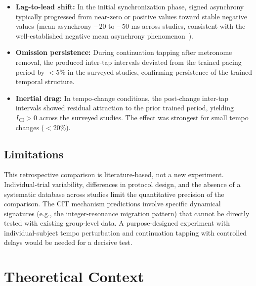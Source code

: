 \documentclass[12pt,a4paper]{article}
\begin{document}
\begin{itemize}

\item \textbf{Lag-to-lead shift:} In the initial synchronization phase, signed asynchrony typically progressed from near-zero or positive values toward stable negative values (mean asynchrony $-20$ to $-50$ ms across studies, consistent with the well-established negative mean asynchrony phenomenon~\cite{repp2005sensorimotor}).

\item \textbf{Omission persistence:} During continuation tapping after metronome removal, the produced inter-tap intervals deviated from the trained pacing period by $<5\%$ in the surveyed studies, confirming persistence of the trained temporal structure.

\item \textbf{Inertial drag:} In tempo-change conditions, the post-change inter-tap intervals showed residual attraction to the prior trained period, yielding $I_{\mathrm{CI}} > 0$ across the surveyed studies. The effect was strongest for small tempo changes ($<20\%$).

\end{itemize}



\subsection{Limitations}



This retrospective comparison is literature-based, not a new experiment. Individual-trial variability, differences in protocol design, and the absence of a systematic database across studies limit the quantitative precision of the comparison. The CIT mechanism predictions involve specific dynamical signatures (e.g., the integer-resonance migration pattern) that cannot be directly tested with existing group-level data. A purpose-designed experiment with individual-subject tempo perturbation and continuation tapping with controlled delays would be needed for a decisive test.



\section{Theoretical Context}
\label{sec:theoretical}
\end{document}
